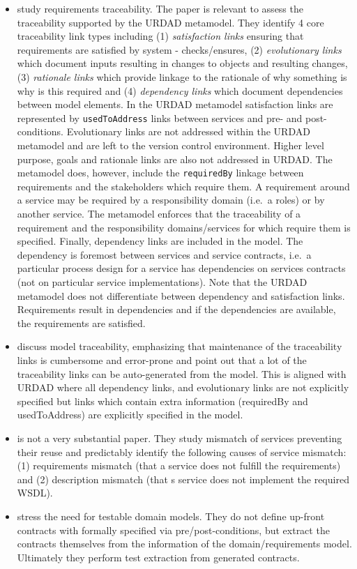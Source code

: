 \begin{itemize}
    \item \cite{ramesh_toward_2001} study requirements traceability. The paper is relevant to assess the traceability supported by the URDAD metamodel. They identify 4 core traceability link types including (1) \emph{satisfaction links} ensuring that requirements are satisfied by system - checks/ensures, (2) \emph{evolutionary links} which document inputs resulting in changes to objects and resulting changes, (3) \emph{rationale links} which provide linkage to the rationale of why something is why is this required and (4) \emph{dependency links} which document dependencies between model elements. In the URDAD metamodel satisfaction links are represented by \verb+usedToAddress+ links between services and pre- and post-conditions. Evolutionary links are not addressed within the URDAD metamodel and are left to the version control environment. Higher level purpose, goals and rationale links are also not addressed in URDAD. The metamodel does, however, include the \verb+requiredBy+ linkage between requirements and the stakeholders which require them. A requirement around a service may be required by a responsibility domain (i.e.\ a roles) or by another service. The metamodel enforces that the traceability of a requirement and the responsibility domains/services for which require them is specified. Finally, dependency links are included in the model. The dependency is foremost between services and service contracts, i.e.\ a particular process design for a service has dependencies on services contracts (not on particular service implementations). Note that the URDAD metamodel does not differentiate between dependency and satisfaction links. Requirements result in dependencies and if the dependencies are available, the requirements are satisfied.
    \item \cite{aizenbud-reshef_model_2006} discuss model traceability, emphasizing that maintenance of the traceability links is cumbersome and error-prone and point out that a lot of the traceability links can be auto-generated from the model. This is aligned with URDAD where all dependency links, and evolutionary links are not explicitly specified but links which contain extra information (requiredBy and usedToAddress) are explicitly specified in the model.
    \item \cite{khoshkbarforoushha_metric_2010} is not a very substantial paper. They study mismatch of services preventing their reuse and predictably identify the following causes of service mismatch: (1) requirements mismatch (that a service does not fulfill the requirements) and (2) description mismatch (that s service does not implement the required WSDL).
  \item \cite{bashardoust-tajali_extracting_2008} stress the need for testable domain models. They do not define up-front contracts with formally specified via pre/post-conditions, but extract the contracts themselves from the information of the domain/requirements model. Ultimately they perform test extraction from generated contracts.

  \end{itemize}

